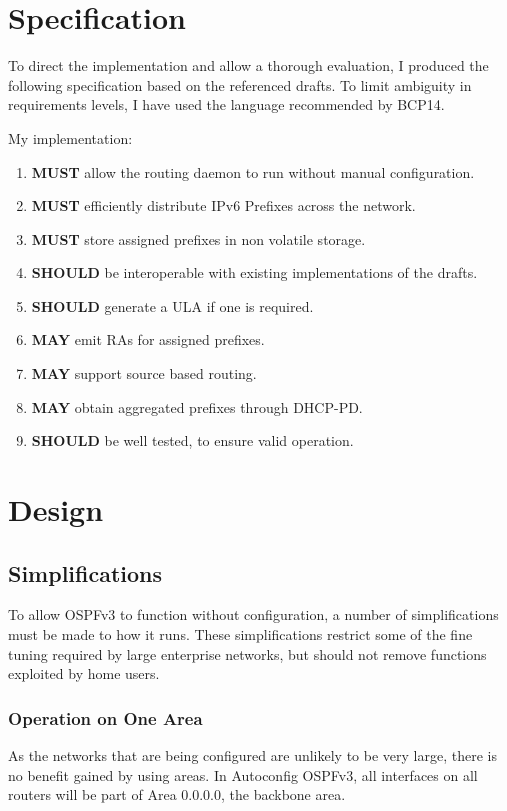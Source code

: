 \documentclass[12pt,a4paper,twoside]{report}
\begin{document}
\chapter{Specification}
To direct the implementation and allow a thorough evaluation, I produced the
following specification based on the referenced drafts. To limit
ambiguity in requirements levels, I have used the language recommended by BCP14.
\cite{rfc2119}

My implementation:
\begin{enumerate}
	\item \textbf{MUST} allow the routing daemon to run without manual configuration.
	\item \textbf{MUST} efficiently distribute IPv6 Prefixes across the network.
	\item \textbf{MUST} store assigned prefixes in non volatile storage.
	\item \textbf{SHOULD} be interoperable with existing implementations of the drafts.
	\item \textbf{SHOULD} generate a ULA if one is required.
	\item \textbf{MAY} emit RAs for assigned prefixes.
	\item \textbf{MAY} support source based routing.
	\item \textbf{MAY} obtain aggregated prefixes through DHCP-PD. 
	\item \textbf{SHOULD} be well tested, to ensure valid operation.
\end{enumerate}

\chapter{Design}

\section{Simplifications}
To allow OSPFv3 to function without configuration, a number of simplifications
must be made to how it runs. These simplifications restrict some of the fine
tuning required by large enterprise networks, but should not remove functions
exploited by home users. 

\subsection{Operation on One Area}
As the networks that are being configured are unlikely to be very large, there
is no benefit gained by using areas. In Autoconfig OSPFv3, all
interfaces on all routers will be part of Area 0.0.0.0, the backbone area.
\end{document}
